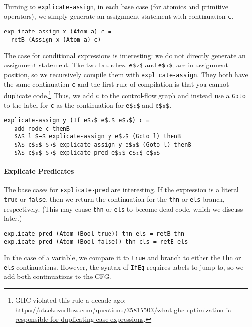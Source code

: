 \documentclass[sigplan,screen]{acmart}
\begin{document}
Turning to \lstinline{explicate-assign}, in each base case (for
atomics and primitive operators), we simply generate an assignment
statement with continuation \lstinline{c}.

\begin{lstlisting}
explicate-assign x (Atom a) c =
  retB (Assign x (Atom a) c)
\end{lstlisting}

The case for conditional expressions is interesting: we do not
directly generate an assignment statement. The two branches,
\lstinline{e$₂$} and \lstinline{e$₃$}, are in assignment position,
so we recursively compile them with \lstinline{explicate-assign}.
They both have the same continuation \lstinline{c} and the first rule
of compilation is that you cannot duplicate code.\footnote{GHC
violated this rule a decade ago:
\url{https://stackoverflow.com/questions/35815503/what-ghc-optimization-is-responsible-for-duplicating-case-expressions}.}
Thus, we add \lstinline{c} to the control-flow graph and
instead use a \lstinline{Goto} to the label for \lstinline{c}
as the continuation for \lstinline{e$₂$} and \lstinline{e$₃$}.

\begin{lstlisting}
explicate-assign y (If e$₁$ e$₂$ e$₃$) c =
   add-node c thenB
   $λ$ l $→$ explicate-assign y e$₂$ (Goto l) thenB
   $λ$ c$₂$ $→$ explicate-assign y e$₃$ (Goto l) thenB
   $λ$ c$₃$ $→$ explicate-pred e$₁$ c$₂$ c$₃$
\end{lstlisting}

\paragraph{Explicate Predicates}

The base cases for \lstinline{explicate-pred} are interesting.  If the
expression is a literal \lstinline{true} or \lstinline{false}, then we
return the continuation for the \lstinline{thn} or \lstinline{els}
branch, respectively. (This may cause \lstinline{thn} or
\lstinline{els} to become dead code, which we discuss later.)

\begin{lstlisting}
explicate-pred (Atom (Bool true)) thn els = retB thn
explicate-pred (Atom (Bool false)) thn els = retB els
\end{lstlisting}

\noindent In the case of a variable, we compare it to \lstinline{true}
and branch to either the \lstinline{thn} or \lstinline{els}
continuations. However, the syntax of \lstinline{IfEq} requires labels
to jump to, so we add both continuations to the CFG.
\end{document}
